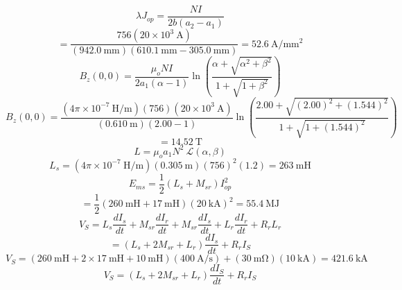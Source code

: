 \begin{equation}%
\lambda J_{op}=\frac{NI}{2b(a_2-a_1)}
\end{equation}
\begin{equation}%
=\frac{756(20\times10^3\ \mathrm{A})}{(942.0\ \mathrm{mm})(610.1\ \mathrm{mm}-305.0\ \mathrm{mm})}=52.6\ \mathrm{A/mm^2}
\end{equation}
\begin{equation}%
B_{z}(0,0)=\frac{\mu_oNI}{2a_1(\alpha-1)}\ln(\frac{\alpha+\sqrt{\alpha^2+\beta^2}}{1+\sqrt{1+\beta^2}})
\end{equation}
\begin{equation}%
B_z(0,0)=\frac{(4\pi\times10^{-7}\ \mathrm{H/m})(756)(20\times10^3\ \mathrm{A})}{(0.610\ \mathrm{m})(2.00-1)}\ln(\frac{2.00+\sqrt{(2.00)^2+(1.544)^2}}{1+\sqrt{1+(1.544)^2}})
\end{equation}
\begin{equation}%
=14.52\ \mathrm{T}
\end{equation}
\begin{equation}%
L=\mu_oa_1N^2\ \mathcal{L}(\alpha,\beta)
\end{equation}
\begin{equation}%
L_s=(4\pi\times10^{-7}\ \mathrm{H/m})(0.305\ \mathrm{m})(756)^2(1.2)=263\ \mathrm{mH}
\end{equation}
\begin{equation}%
E_{ms}=\frac{1}{2}(L_s+M_{sr})I_{op}^2
\end{equation}
\begin{equation}%
=\frac{1}{2}(260\ \mathrm{mH}+17\ \mathrm{mH})(20\ \mathrm{kA})^2=55.4\ \mathrm{MJ}
\end{equation}
\begin{equation}%
V_S=L_s\frac{dI_s}{dt}+M_{sr}\frac{dI_r}{dt}+M_{sr}\frac{dI_s}{dt}+L_r\frac{dI_r}{dt}+R_rL_r
\end{equation}
\begin{equation}%
=(L_s+2M_{sr}+L_r)\frac{dI_s}{dt}+R_rI_S
\end{equation}
\begin{equation}%
V_S=(260\ \mathrm{mH}+2\times17\ \mathrm{mH}+10\ \mathrm{mH})(400\ \mathrm{A/s})+(30\ \mathrm{m\Omega})(10\ \mathrm{kA})=421.6\ \mathrm{kA}
\end{equation}
\begin{equation}%
V_S=(L_s+2M_{sr}+L_r)\frac{dI_S}{dt}+R_rI_S
\end{equation}
